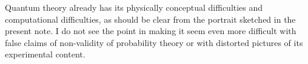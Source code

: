 \documentclass[\ifafour a4paper,12pt,\else a5paper,10pt,\fi%
onecolumn,oneside,article,%
british%
]{memoir}
\makeatletter
\theoremstyle{remark}
\theoremstyle{innote}
\def\sum{\DOTSI\sumop\slimits@}
\newcommand*{\mathte}[1]{\textbf{\textit{\textsf{#1}}}}
\newcommand*{\de}{\partialup}%
\newcommand*{\p}{\mathrm{P}}%
\renewcommand*{\|}[1][]{\nonscript\,#1\vert\nonscript\;\mathopen{}}
\newcommand*{\tsum}{\mathop{\textstyle\sum}\nolimits}
\newcommand*{\yM}{\mathte{M}}
\makeatother
\begin{document}
Quantum theory already has its physically conceptual difficulties and
computational difficulties, as should be clear from the portrait sketched
in the present note. I do not see the point in making it seem even more
difficult with false claims of non-validity of probability theory or with
distorted pictures of its experimental content.









\end{document}
